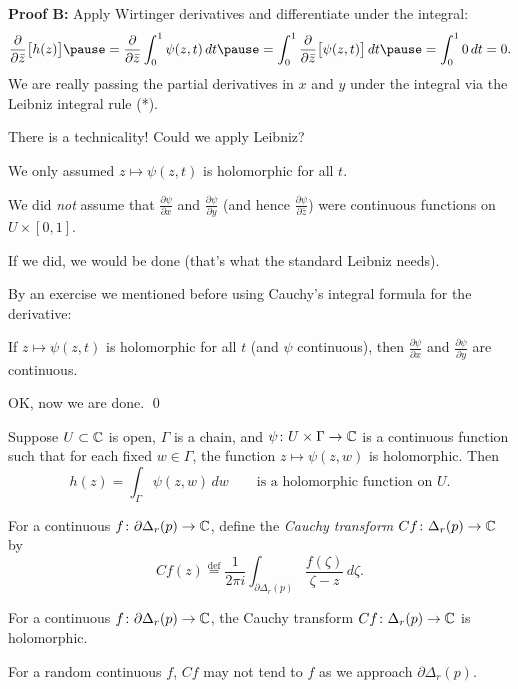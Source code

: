 \documentclass[10pt,aspectratio=169]{beamer}
\begin{document}
\begin{frame}

\textbf{Proof B:}
Apply Wirtinger derivatives and differentiate under the integral:
\pause
\[
\frac{\partial}{\partial \bar{z}}
\bigl[
h(z)
\bigr]
\pause
=
\frac{\partial}{\partial \bar{z}}
\int_0^1 \psi(z,t) \, dt
\pause
=
\int_0^1
\frac{\partial}{\partial \bar{z}}
\bigl[
\psi(z,t)
\bigr]
\, dt
\pause
= \int_0^1 0 \, dt = 0.
\]
\pause
We are really passing the partial derivatives in $x$
and $y$ under the integral via the Leibniz integral rule (*).

\medskip
\pause

There is a technicality!  Could we apply Leibniz?

\medskip
\pause

We only assumed $z \mapsto \psi(z,t)$ is holomorphic for all $t$.

\pause
\medskip

We did \emph{not} assume that
$\frac{\partial \psi}{\partial x}$ and $\frac{\partial \psi}{\partial y}$
(and hence
$\frac{\partial \psi}{\partial \bar{z}}$)
were continuous functions on $U \times [0,1]$.

If we did, we would be done (that's what the standard Leibniz needs).

\medskip
\pause

By an exercise we mentioned before using
Cauchy's integral formula for the derivative:

If
$z \mapsto \psi(z,t)$ is holomorphic for all $t$ (and $\psi$ continuous),
then
$\frac{\partial \psi}{\partial x}$ and $\frac{\partial \psi}{\partial y}$
are continuous.

\medskip
\pause

OK, now we are done.
\qed

\end{frame}

\begin{frame}
\begin{corollary}
Suppose $U \subset {\mathbb{C}}$ is open, $\Gamma$ is a 
chain,
and
$\psi \colon U \times \Gamma \to {\mathbb{C}}$ is a continuous function such that
for each fixed $w \in \Gamma$, the function $z \mapsto \psi(z,w)$ is
holomorphic.  Then
\[
h(z) =
\int_\Gamma \psi(z,w) \, dw
\qquad \text{is a holomorphic function on } U.
\]
\end{corollary}
\pause

For a continuous $f \colon \partial \Delta_r(p) \to {\mathbb{C}}$, define
the \emph{Cauchy transform} $Cf \colon \Delta_r(p) \to {\mathbb{C}}$ by
\begin{equation*}
Cf(z)
\overset{\text{def}}{=}
\frac{1}{2\pi i}
\int_{\partial \Delta_r(p)}
\frac{f(\zeta)}{\zeta-z}\, d\zeta .
\end{equation*}
\pause

\begin{corollary}
For a continuous $f \colon \partial \Delta_r(p) \to {\mathbb{C}}$,
the Cauchy transform $Cf \colon \Delta_r(p) \to {\mathbb{C}}$ is holomorphic.
\end{corollary}

\pause

For a random continuous $f$, $Cf$ may not tend to $f$ as we approach
$\partial \Delta_r(p)$.
\end{frame}
\end{document}
